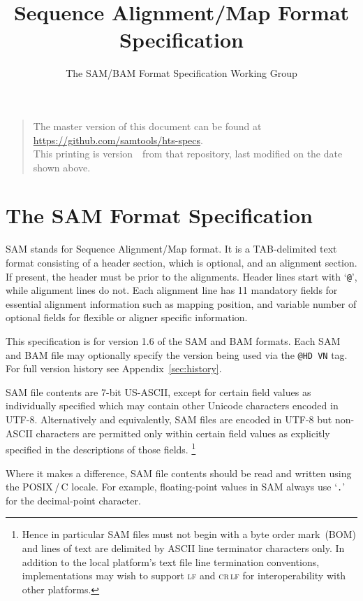 \documentclass[10pt]{article}
\begin{document}

\title{Sequence Alignment/Map Format Specification}
\author{The SAM/BAM Format Specification Working Group}
\date{\headdate}
\maketitle
\begin{quote}\small
The master version of this document can be found at
\url{https://github.com/samtools/hts-specs}.\\
This printing is version~\commitdesc\ from that repository,
last modified on the date shown above.
\end{quote}
\vspace*{1em}


\section{The SAM Format Specification}
SAM stands for Sequence Alignment/Map format. It is a TAB-delimited text
format consisting of a header section, which is optional, and an
alignment section. If present, the header must be prior to the
alignments. Header lines start with `{\tt @}', while alignment lines do
not. Each alignment line has 11 mandatory fields for essential alignment
information such as mapping position, and variable number of optional
fields for flexible or aligner specific information.

This specification is for version 1.6 of the SAM and BAM formats.  Each SAM and
BAM file may optionally specify the version being used via the
{\tt @HD VN} tag. For full version history see Appendix~\ref{sec:history}. 

SAM file contents are 7-bit US-ASCII, except for certain field values as individually specified which may contain other Unicode characters encoded in UTF-8.
Alternatively and equivalently, SAM files are encoded in UTF-8 but non-ASCII characters are permitted only within certain field values as explicitly specified in the descriptions of those fields.%
\footnote{Hence in particular SAM files must not begin with a byte order mark~(BOM) and lines of text are delimited by ASCII line terminator characters only.
In addition to the local platform's text file line termination conventions, implementations may wish to support \textsc{lf} and \textsc{cr\,lf} for interoperability with other platforms.}

Where it makes a difference, SAM file contents should be read and written using the POSIX\,/\,C locale.
For example, floating-point values in SAM always use `{\tt .}' for the decimal-point character.
\end{document}
